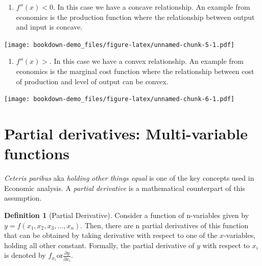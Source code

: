 \documentclass[
]{book}
\providecommand{\tightlist}{%
  \setlength{\itemsep}{0pt}\setlength{\parskip}{0pt}}
\theoremstyle{definition}
\newtheorem{definition}{Definition}[chapter]
\theoremstyle{definition}
\theoremstyle{definition}
\theoremstyle{definition}
\theoremstyle{remark}
\begin{document}
\begin{enumerate}
\def\labelenumi{\arabic{enumi}.}
\tightlist
\item
  \(f''(x)<0\). In this case we have a concave relationship. An example from economics is the production function where the relationship between output and input is concave.
\end{enumerate}

\texttt{[image: bookdown-demo\_files/figure-latex/unnamed-chunk-5-1.pdf]}

\begin{enumerate}
\def\labelenumi{\arabic{enumi}.}
\setcounter{enumi}{1}
\tightlist
\item
  \(f''(x)>\). In this case we have a convex relationship. An example from economics is the marginal cost function where the relationship between cost of production and level of output can be convex.
\end{enumerate}

\texttt{[image: bookdown-demo\_files/figure-latex/unnamed-chunk-6-1.pdf]}

\hypertarget{partial-derivatives-multi-variable-functions}{%
\section{Partial derivatives: Multi-variable functions}\label{partial-derivatives-multi-variable-functions}}

\emph{Ceteris paribus} aka \emph{holding other things equal} is one of the key concepts used in Economic analysis. A \emph{partial derivative} is a mathematical counterpart of this assumption.

\begin{definition}[Partial Derivative]
\protect\hypertarget{def:unnamed-chunk-7}{}\label{def:unnamed-chunk-7}Consider a function of n-variables given by \(y=f(x_1,x_2, x_3,...,x_n)\). Then, there are n partial derivatives of this function that can be obtained by taking derivative with respect to one of the \(x\)-variables, holding all other constant. Formally, the partial derivative of \(y\) with respect to \(x_i\) is denoted by \(\displaystyle{f_{x_i} \text{or} \frac{\partial y}{\partial x_i}}\).
\end{definition}
\end{document}
